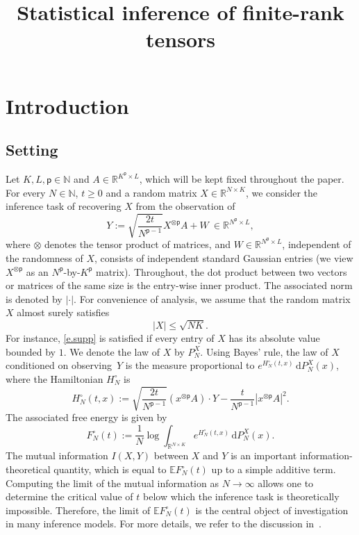\documentclass[AHL,Unicode,longabstracts,published]{cedram}
\title[Statistical inference of finite-rank tensors]{Statistical inference of finite-rank tensors}
\author[\initial{H.} \lastname{Chen}]{\firstname{Hongbin} \lastname{Chen}}
\author[\initial{J-C.} \lastname{Mourrat}]{\firstname{Jean-Christophe} \lastname{Mourrat}}
\author[\initial{J.} \lastname{Xia}]{\firstname{Jiaming} \lastname{Xia}}
\newcommand{\N}{\mathbb{N}}
\newcommand{\R}{\mathbb{R}}
\newcommand{\E}{\mathbb{E}}
\renewcommand{\d}{\mathrm{d}}
\newcommand{\sfp}{\mathsf{p}}
\renewcommand{\leq}{\leqslant}
\renewcommand{\geq}{\geqslant}
\begin{document}
\maketitle

\section{Introduction}

\subsection{Setting}\label{s.setting}
Let $K,L,\sfp\in\N$ and $A\in \R^{K^\sfp\times L}$, which will be kept fixed throughout the paper. For every $N\in \N$, $t\geq 0$ and a random matrix $X\in \R^{N\times K}$, we consider the inference task of recovering $X$ from the observation of
\begin{equation}\label{e.Y}
Y := \sqrt{\frac{2t}{N^{\sfp-1}}}X^{\otimes \sfp}A+W \ \in \R^{N^\sfp\times L},
\end{equation}
where $\otimes$ denotes the tensor product of matrices, and $W\in \R^{N^\sfp\times L}$, independent of the randomness of $X$, consists of independent standard Gaussian entries (we view $X^{\otimes \sfp}$ as an $N^\sfp$-by-$K^\sfp$ matrix). Throughout, the dot product between two vectors or matrices of the same size is the entry-wise inner product. The associated norm is denoted by $|\cdot|$. For convenience of analysis, we assume that the random matrix $X$ almost surely satisfies
\begin{equation}\label{e.supp}
|X|\leq \sqrt{NK}.
\end{equation}
For instance, \eqref{e.supp} is satisfied if every entry of $X$ has its absolute value bounded by $1$. We denote the law of $X$ by $P_N^X$. Using Bayes' rule, the law of $X$ conditioned on observing~$Y$ is the measure proportional to $e^{H^\circ_N(t,x)} \, \d P^X_N(x)$, where the Hamiltonian $H^\circ_N$ is
\begin{equation*}
H^\circ_N(t,x) := \sqrt{\frac{2t}{N^{\sfp-1}}}\left(x^{\otimes \sfp}A\right)\cdot Y-\frac{t}{N^{\sfp-1}}\left|x^{\otimes \sfp}A\right|^2.
\end{equation*}
The associated free energy is given by
\begin{equation*}
F^\circ_N(t) := \frac{1}{N} \log \int_{\R^{N\times K}}e^{H^\circ_N(t,x)}\, \d P^X_N(x).
\end{equation*}
The mutual information $I(X,Y)$ between $X$ and $Y$ is an important information-theoretical quantity, which is equal to $\E F^\circ_N(t)$ up to a simple additive term. Computing the limit of the mutual information as $N\to\infty$ allows one to determine the critical value of $t$ below which the inference task is theoretically impossible. Therefore, the limit of $\E F^\circ_N(t)$ is the central object of investigation in many inference models. For more details, we refer to the discussion in~\cite{barbier2016}.
\end{document}
